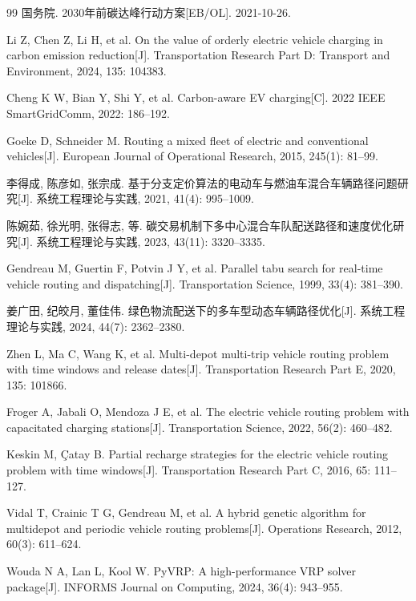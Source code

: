 \documentclass{setp-new}
\begin{document}
\begin{thebibliography}{99}
国务院. 2030年前碳达峰行动方案[EB/OL]. 2021-10-26.

Li Z, Chen Z, Li H, et al. On the value of orderly electric vehicle charging in carbon emission reduction[J]. Transportation Research Part D: Transport and Environment, 2024, 135: 104383.

Cheng K W, Bian Y, Shi Y, et al. Carbon-aware EV charging[C]. 2022 IEEE SmartGridComm, 2022: 186--192.

Goeke D, Schneider M. Routing a mixed fleet of electric and conventional vehicles[J]. European Journal of Operational Research, 2015, 245(1): 81--99.

李得成, 陈彦如, 张宗成. 基于分支定价算法的电动车与燃油车混合车辆路径问题研究[J]. 系统工程理论与实践, 2021, 41(4): 995--1009.

陈婉茹, 徐光明, 张得志, 等. 碳交易机制下多中心混合车队配送路径和速度优化研究[J]. 系统工程理论与实践, 2023, 43(11): 3320--3335.

Gendreau M, Guertin F, Potvin J Y, et al. Parallel tabu search for real-time vehicle routing and dispatching[J]. Transportation Science, 1999, 33(4): 381--390.

姜广田, 纪皎月, 董佳伟. 绿色物流配送下的多车型动态车辆路径优化[J]. 系统工程理论与实践, 2024, 44(7): 2362--2380.

Zhen L, Ma C, Wang K, et al. Multi-depot multi-trip vehicle routing problem with time windows and release dates[J]. Transportation Research Part E, 2020, 135: 101866.

Froger A, Jabali O, Mendoza J E, et al. The electric vehicle routing problem with capacitated charging stations[J]. Transportation Science, 2022, 56(2): 460--482.

Keskin M, Çatay B. Partial recharge strategies for the electric vehicle routing problem with time windows[J]. Transportation Research Part C, 2016, 65: 111--127.

Vidal T, Crainic T G, Gendreau M, et al. A hybrid genetic algorithm for multidepot and periodic vehicle routing problems[J]. Operations Research, 2012, 60(3): 611--624.

Wouda N A, Lan L, Kool W. PyVRP: A high-performance VRP solver package[J]. INFORMS Journal on Computing, 2024, 36(4): 943--955.

\end{thebibliography}
\end{document}
